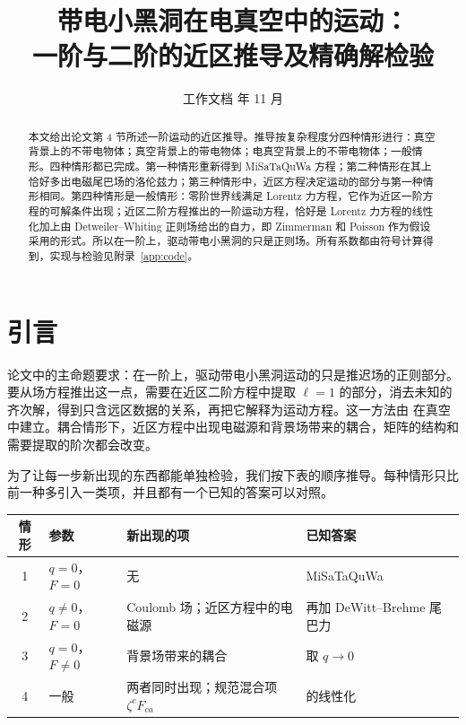 \documentclass[11pt,a4paper]{ctexart}
\title{带电小黑洞在电真空中的运动：\\一阶与二阶的近区推导及精确解检验}
\author{}
\date{工作文档 \quad 2026 年 11 月}
\numberwithin{equation}{section}
\begin{document}
\maketitle

\begin{abstract}
本文给出论文第 4 节所述一阶运动的近区推导。推导按复杂程度分四种情形进行：真空背景上的不带电物体；真空背景上的带电物体；电真空背景上的不带电物体；一般情形。四种情形都已完成。第一种情形重新得到 MiSaTaQuWa 方程；第二种情形在其上恰好多出电磁尾巴场的洛伦兹力；第三种情形中，近区方程决定运动的部分与第一种情形相同。第四种情形是一般情形：零阶世界线满足 Lorentz 力方程，它作为近区一阶方程的可解条件出现；近区二阶方程推出的一阶运动方程，恰好是 Lorentz 力方程的线性化加上由 Detweiler--Whiting 正则场给出的自力，即 Zimmerman 和 Poisson 作为假设采用的形式。所以在一阶上，驱动带电小黑洞的只是正则场。所有系数都由符号计算得到，实现与检验见附录~\ref{app:code}。
\end{abstract}

\tableofcontents

\section{引言}

论文中的主命题要求：在一阶上，驱动带电小黑洞运动的只是推迟场的正则部分。要从场方程推出这一点，需要在近区二阶方程中提取 $\ell=1$ 的部分，消去未知的齐次解，得到只含远区数据的关系，再把它解释为运动方程。这一方法由 \citet{GrallaWald2008} 在真空中建立。耦合情形下，近区方程中出现电磁源和背景场带来的耦合，矩阵的结构和需要提取的阶次都会改变。

为了让每一步新出现的东西都能单独检验，我们按下表的顺序推导。每种情形只比前一种多引入一类项，并且都有一个已知的答案可以对照。

\begin{center}\small
\begin{tabular}{cp{}p{}p{}}
\hline
情形 & 参数 & 新出现的项 & 已知答案\\
\hline
1 & $q=0$，$F=0$ & 无 & MiSaTaQuWa \citep{MinoSasakiTanaka1997,QuinnWald1997}\\
2 & $q\neq0$，$F=0$ & Coulomb 场；近区方程中的电磁源 & 再加 DeWitt--Brehme 尾巴力 \citep{DeWittBrehme1960,Hobbs1968}\\
3 & $q=0$，$F\neq0$ & 背景场带来的耦合 & \citet{ZimmermanPoisson2014} 取 $q\to0$\\
4 & 一般 & 两者同时出现；规范混合项 $\zeta^cF_{ca}$ & \citet{ZimmermanPoisson2014} 的线性化\\
\hline
\end{tabular}
\end{center}
\end{document}
